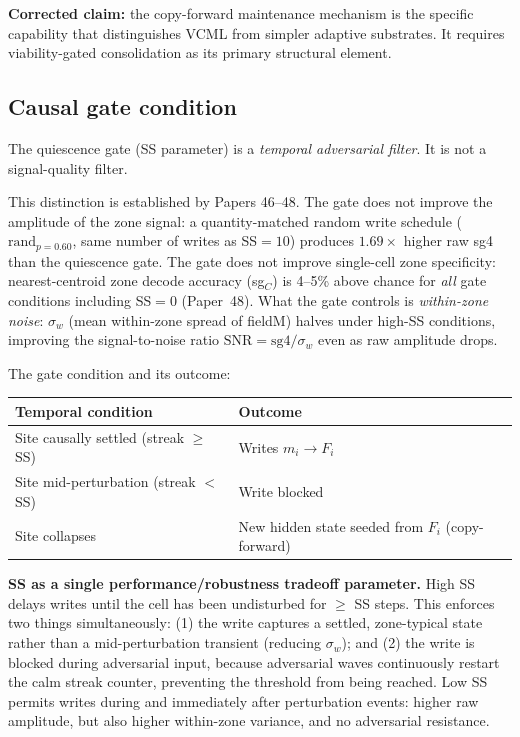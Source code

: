 \documentclass[11pt]{article}
\begin{document}
\textbf{Corrected claim:} the copy-forward maintenance mechanism is the specific capability that
distinguishes VCML from simpler adaptive substrates.
It requires viability-gated consolidation as its primary structural element.

\subsection{Causal gate condition}

The quiescence gate (SS parameter) is a \emph{temporal adversarial filter}.
It is not a signal-quality filter.

This distinction is established by Papers 46--48.
The gate does not improve the amplitude of the zone signal:
a quantity-matched random write schedule ($\mathrm{rand}_{p=0.60}$, same number of writes
as SS$=10$) produces $1.69\times$ higher raw sg4 than the quiescence gate.
The gate does not improve single-cell zone specificity:
nearest-centroid zone decode accuracy (sg$_C$) is 4--5\% above chance
for \emph{all} gate conditions including SS$=0$ (Paper~48).
What the gate controls is \emph{within-zone noise}: $\sigma_w$ (mean within-zone spread
of fieldM) halves under high-SS conditions, improving the signal-to-noise ratio
$\mathrm{SNR} = \mathrm{sg4}/\sigma_w$ even as raw amplitude drops.

The gate condition and its outcome:

\begin{center}
\begin{tabular}{ll}
\toprule
\textbf{Temporal condition} & \textbf{Outcome} \\
\midrule
Site causally settled (streak $\geq$ SS) & Writes $m_i \to F_i$ \\
Site mid-perturbation (streak $< $ SS)   & Write blocked \\
Site collapses                           & New hidden state seeded from $F_i$ (copy-forward) \\
\bottomrule
\end{tabular}
\end{center}

\textbf{SS as a single performance/robustness tradeoff parameter.}
High SS delays writes until the cell has been undisturbed for $\geq$ SS steps.
This enforces two things simultaneously: (1) the write captures a settled, zone-typical
state rather than a mid-perturbation transient (reducing $\sigma_w$); and (2) the write
is blocked during adversarial input, because adversarial waves continuously restart the
calm streak counter, preventing the threshold from being reached.
Low SS permits writes during and immediately after perturbation events: higher raw amplitude,
but also higher within-zone variance, and no adversarial resistance.
\end{document}
